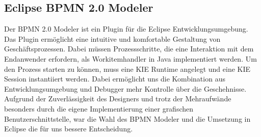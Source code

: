 \subsection{Eclipse BPMN 2.0 Modeler}
Der BPMN 2.0 Modeler ist ein Plugin für die Eclipse Entwicklungsumgebung. Das Plugin ermöglicht eine intuitive und komfortable Gestaltung von Geschäftsprozessen. Dabei müssen Prozessschritte, die eine Interaktion mit dem Endanwender erfordern, als Workitemhandler in Java implementiert werden. Um den Prozess starten zu können, muss eine KIE Runtime angelegt und eine KIE Session instantiiert werden. Dabei ermöglicht uns die Kombination aus Entwicklungsumgebung und Debugger mehr Kontrolle über die Geschehnisse. Aufgrund der Zuverlässigkeit des Designers und trotz der Mehraufwände besonders durch die eigene Implementierung einer grafischen Benutzerschnittstelle, war die Wahl des BPMN Modeler und die Umsetzung in Eclipse die für uns bessere Entscheidung. 